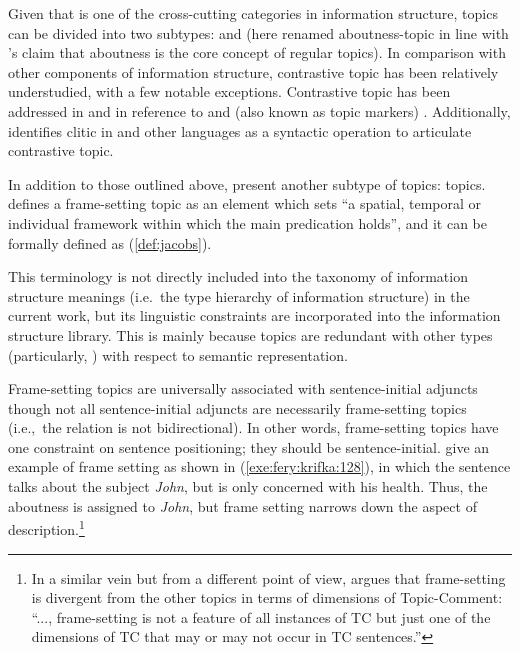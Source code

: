Given that  is one of the cross-cutting categories in
information structure, topics can be divided into two subtypes:
 and  (here renamed
aboutness-topic in line with \citeauthor{choi:99}'s claim that
aboutness is the core concept of regular topics).  In comparison with
other components of information structure, contrastive topic has been
relatively understudied, with a few notable exceptions.  Contrastive
topic has been addressed in  and  in
reference to \wa and \nun (also known as topic markers)
\citep{kuno:73,choi:99}. Additionally, \citet{arregi:03} identifies
clitic  in  and other languages as
a syntactic operation to articulate contrastive topic.


In addition to those outlined above, \citet{fery:krifka:08} present
another subtype of topics:  topics.
\cite[50]{chafe:76} defines a frame-setting topic as an element
which sets ``a spatial, temporal or individual framework within which
the main predication holds'', and it can be formally defined as
(\ref{def:jacobs}).



\noindent This terminology is not directly included into the taxonomy
of information structure meanings (i.e.\ the type hierarchy of
information structure) in the current work, but its linguistic
constraints are incorporated into the information structure
library. This is mainly because  topics are
redundant with other  types (particularly, )
with respect to semantic representation.


Frame-setting topics are universally associated with
sentence-initial adjuncts \citep[118]{lambrecht:96} though not all
sentence-initial adjuncts are necessarily frame-setting topics
(i.e.,\ the relation is not bidirectional). In other
words, frame-setting topics have one constraint on sentence
positioning; they should be sen\-tence-initial.  \citet{fery:krifka:08}
give an example of frame setting as shown in
(\ref{exe:fery:krifka:128}), in which the sentence talks about the
subject \textit{John}, but is only concerned with his health. Thus,
the aboutness  is assigned to \textit{John}, but frame setting
narrows down the aspect of description.\footnote{In a similar vein but
  from a different point of view, \citet[656]{jacobs:01} argues
  that frame-setting is divergent from the other topics in terms of
  dimensions of Topic-Comment: ``..., frame-setting is not a feature
  of all instances of TC but just one of the dimensions of TC that may
  or may not occur in TC sentences.''  }


